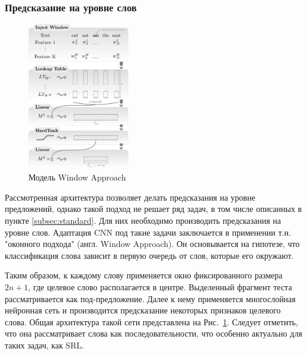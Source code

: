 \subsubsection{Предсказание на уровне слов}
\begin{figure}[t]
\centering
\includegraphics[width=0.4\textwidth]{img/network-window}
\caption{\label{fig:network-window}Модель Window Approach}
\end{figure}
Рассмотренная архитектура позволяет делать предсказания на уровне предложений, однако такой подход не решает ряд задач, в том числе описанных в пункте \ref{subsec:standard}. Для них необходимо производить предсказания на уровне слов. Адаптация CNN под такие задачи заключается в применении т.н. "оконного подхода" (англ. Window Approach).  Он основывается на гипотезе, что классификация слова зависит в первую очередь от слов, которые его окружают.

Таким образом, к каждому слову применяется окно фиксированного размера $2n + 1$, где целевое слово располагается в центре. Выделенный фрагмент теста рассматривается как под-предложение. Далее к нему применяется многослойная нейронная сеть и производится предсказание некоторых признаков целевого слова. Общая архитектура такой сети представлена на Рис.~\ref{fig:network-window}. Следует отметить, что она рассматривает слова как последовательности, что особенно актуально для таких задач, как SRL. 


